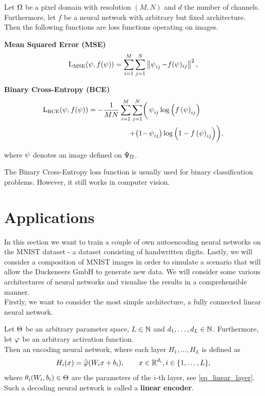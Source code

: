 \begin{example}
Let $\Omega$ be a pixel domain with resolution $(M,N)$ and $d$ the number of channels. Furthermore, let $f$ be a neural network with arbitrary but fixed architecture.\\
Then the following functions are loss functions operating on images.
\begin{mydescription}{}
\item[\textbf{Mean Squared Error (MSE)}] \begin{align*}
\operatorname{L_\text{MSE}}(\operatorname{\psi}, f(\operatorname{\psi})) = \sum_{i=1}^{M}\sum_{j=1}^{N}\left\|\operatorname{\psi}_{ij} - f(\operatorname{\psi})_{ij}\right\|^2,
\end{align*}
\item[\textbf{Binary Cross-Entropy (BCE)}]
\begin{align*}
\operatorname{L_\text{BCE}}(\operatorname{\psi}, f(\operatorname{\psi})) = - \frac{1}{MN}\sum_{i=1}^{M}\sum_{j=1}^{N} \biggl(&\operatorname{\psi}_{ij} \log\left(f\left(\operatorname{\psi}\right)_{ij}\right)\\ + \bigl(1-&\operatorname{\psi}_{ij}\bigr)\log\left(1 - f\left(\operatorname{\psi}\right)_{ij}\right)\biggr),
\end{align*}
\end{mydescription}
where $\operatorname{\psi}$ denotes an image defined on $\Psi_{\Omega}$.
\end{example}


\begin{remark}
The Binary Cross-Entropy loss function is usually used for binary classification problems. However, it still works in computer vision.
\end{remark}


\section{Applications}

In this section we want to train a couple of own autoencoding neural networks on the MNIST dataset - a dataset consisting of handwritten digits. Lastly, we will consider a composition of MNIST images in order to simulate a scenario that will allow the Duckeneers GmbH to generate new data. We will consider some various architectures of neural networks and visualise the results in a comprehensible manner.\\
Firstly, we want to consider the most simple architecture, a fully connected linear neural network.

\begin{definition}\label{def_linear_encoder}
Let $\operatorname{\Theta}$ be an arbitrary parameter space, $L\in \operatorname{\mathbb{N}}$ and $d_1,\ldots,d_L \in \operatorname{\mathbb{N}}$. Furthermore, let $\operatorname{\varphi}$ be an arbitrary activation function.\\
Then an encoding neural network, where each layer $H_1,\ldots, H_L$ is defined as
\begin{align*}
H_i(x) = \widehat{\operatorname{\varphi}}(W_ix + b_i), \qquad x \in \operatorname{\mathbb{R}}^{d_i}, i \in \{1,\ldots, L\},
\end{align*}
where $\theta_i(W_i, b_i)\in\operatorname{\Theta}$ are the parameters of the $i$-th layer, see \eqref{eq_linear_layer}. Such a decoding neural network is called a \textbf{linear encoder}.
\end{definition}

